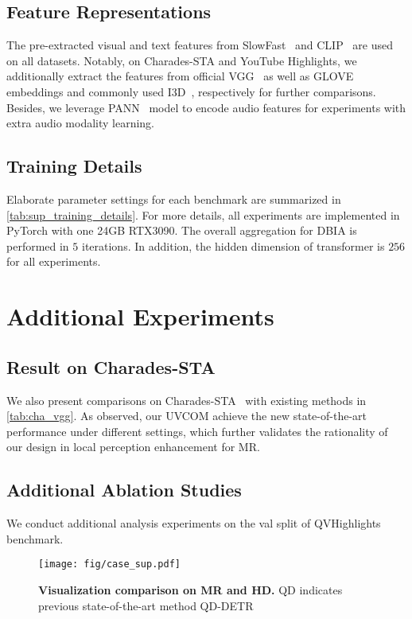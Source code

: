 \documentclass[10pt,twocolumn,letterpaper]{article}
\begin{document}
\subsection{Feature Representations}
\label{sup:features}
The pre-extracted visual and text features from SlowFast~\cite{slowfast} and CLIP~\cite{clip} are used on all datasets.
Notably, on Charades-STA and YouTube Highlights, we additionally extract the features from official VGG~\cite{vgg} as well as GLOVE~\cite{glove} embeddings and commonly used I3D~\cite{i3d}, respectively for further comparisons. Besides, we leverage PANN~\cite{pann} model to encode audio features for experiments with extra audio modality learning.

\subsection{Training Details}
\label{sup:training details}
Elaborate parameter settings for each benchmark are summarized in \cref{tab:sup_training_details}. For more details,  
all experiments are implemented in PyTorch with one 24GB RTX3090.
The overall aggregation for DBIA is performed in $5$ iterations. In addition, the hidden dimension of transformer is $256$ for all experiments. 


\section{Additional Experiments}

\subsection{Result on Charades-STA}
\label{sup:result_cha_vgg}
We also present comparisons on Charades-STA~\cite{cha} with existing methods in \cref{tab:cha_vgg}. As observed, our UVCOM achieve the new state-of-the-art performance under different settings, which further validates the rationality of our design in local perception enhancement for MR.

\subsection{Additional Ablation Studies}
We conduct additional analysis experiments on the val split of QVHighlights benchmark.
\begin{figure*}[ht]
\centering
    \texttt{[image: fig/case\_sup.pdf]}
    \caption{\textbf{Visualization comparison on MR and HD.} QD indicates previous state-of-the-art method QD-DETR~\cite{qddetr}}
    \label{fig:sup_case_show}
\end{figure*}
\end{document}
